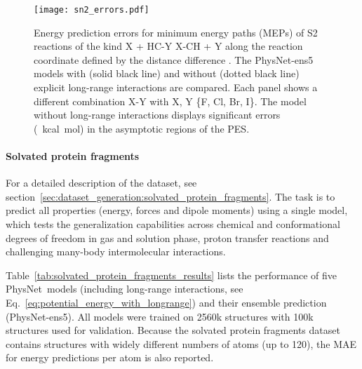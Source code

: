 \documentclass[12pt]{article}
\newcommand{\nn}{PhysNet}
\begin{document}
\begin{figure}[htbp]
\centering
\captionsetup{width=1.0\textwidth}
\texttt{[image: sn2\_errors.pdf]}
\caption{Energy prediction errors for minimum energy paths (MEPs) of
  S2 reactions of the kind X + HC-Y 
  X-CH + Y along the reaction coordinate defined by the
  distance difference . The \nn-ens5 models
  with (solid black line) and without (dotted black line) explicit
  long-range interactions are compared. Each panel shows a different
  combination X-Y with X, Y  \{F, Cl, Br, I\}. The model without
  long-range interactions displays significant errors
  (~kcal~mol) in the asymptotic regions of the PES.}
	\label{fig:sn2_errors}
\end{figure}


\paragraph{Solvated protein fragments}
For a detailed description of the dataset, see
section~\ref{sec:dataset_generation:solvated_protein_fragments}. The
task is to predict all properties (energy, forces and dipole moments)
using a single model, which tests the generalization capabilities
across chemical and conformational degrees of freedom in gas and
solution phase, proton transfer reactions and challenging many-body
intermolecular interactions.

Table~\ref{tab:solvated_protein_fragments_results} lists the
performance of five \nn\ models (including long-range interactions,
see Eq.~\ref{eq:potential_energy_with_longrange}) and their
ensemble\cite{breiman1996bagging} prediction (\nn-ens5). All models
were trained on 2560k structures with 100k structures used for
validation. Because the solvated protein fragments dataset contains
structures with widely different numbers of atoms (up to 120), the MAE
for energy predictions per atom is also reported.
\end{document}
